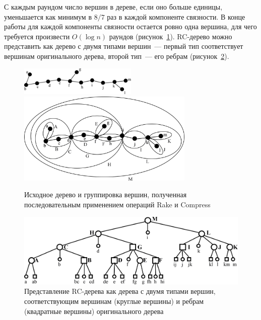 \documentclass[specification,annotation,times]{itmo-student-thesis}
\begin{document}
С каждым раундом число вершин в дереве, если оно больше единицы, уменьшается как минимум в $8/7$ раз в каждой компоненте связности. В конце работы для каждой компоненты связности
остается ровно одна вершина, для чего требуется произвести $O(\log n)$ раундов (рисунок~\ref{fig:rctree-overall}). RC-дерево можно представить как дерево с двумя типами вершин~--- первый тип соответствует 
вершинам оригинального дерева, второй тип~--- его ребрам (рисунок~\ref{fig:rctree-two-types}).

\begin{figure}[!ht]
\centering
\includegraphics[width=0.5\textwidth]{pic/rc_tree_1_primitive_tree.png}\\
\includegraphics[width=0.75\textwidth]{pic/rc_tree_2_completed_clustering.png}
\caption{Исходное дерево и группировка вершин, полученная последовательным применением операций Rake и Compress}\label{fig:rctree-overall}
\end{figure}

\begin{figure}[!ht]
\centering
\includegraphics[width=\textwidth]{pic/rc_tree_4_two_types.png}
\caption{Представление RC-дерева как дерева с двумя типами вершин, соответствующим вершинам (круглые вершины) и ребрам (квадратные вершины) оригинального дерева}\label{fig:rctree-two-types}
\end{figure}
\end{document}
